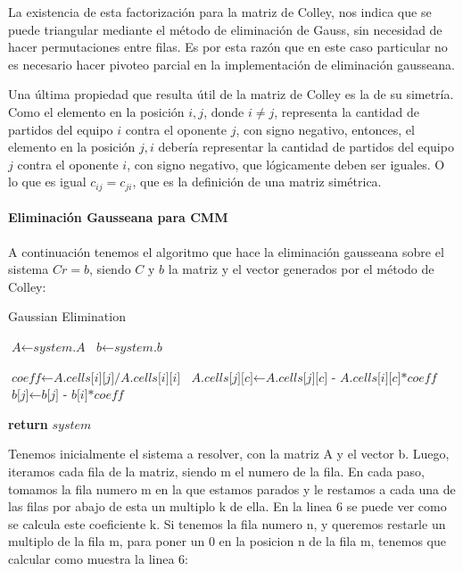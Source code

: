 \documentclass[a4paper]{article}
\begin{document}
La existencia de esta factorización para la matriz de Colley, nos indica que se puede triangular mediante el método de eliminación de Gauss, sin necesidad de hacer permutaciones entre filas. Es por esta razón que en este caso particular no es necesario hacer pivoteo parcial en la implementación de eliminación gausseana.

Una última propiedad que resulta útil de la matriz de Colley es la de su simetría. Como el elemento en la posición $i,j$, donde $i \neq j$, representa la cantidad de partidos del equipo $i$ contra el oponente $j$, con signo negativo, entonces, el elemento en la posición $j,i$ debería representar la cantidad de partidos del equipo $j$ contra el oponente $i$, con signo negativo, que lógicamente deben ser iguales. O lo que es igual $c_{ij} = c_{ji}$, que es la definición de una matriz simétrica.

\paragraph{Eliminación Gausseana para CMM}

A continuación tenemos el algoritmo que hace la eliminación gausseana sobre el sistema $Cr = b$, siendo $C$ y $b$ la matriz y el vector generados por el método de Colley:

\begin{algorithm}
\caption{Gaussian Elimination}\label{euclid}
\begin{algorithmic}[1]


\State $\textit{A} \gets \textit{system.A}$
\State $\textit{b} \gets \textit{system.b}$

        \State $\textit{coeff} \gets \textit{A.cells[i][j]/A.cells[i][i]}$
            \State $\textit{A.cells[j][c]} \gets \textit{A.cells[j][c] - A.cells[i][c]*coeff}$
        \EndFor
		\State $\textit{b[j]} \gets \textit{b[j] - b[i]*coeff}$
    \EndFor
\EndFor

\State \textbf{return} $\textit{system}$
\EndProcedure
\end{algorithmic}
\end{algorithm}

Tenemos inicialmente el sistema a resolver, con la matriz A y el vector b. Luego, iteramos cada fila de la matriz, siendo m el numero de la fila. En cada paso, tomamos la fila numero m en la que estamos parados y le restamos a cada una de las filas por abajo de esta un multiplo k de ella. En la linea 6 se puede ver como se calcula este coeficiente k. Si tenemos la fila numero n, y queremos restarle un multiplo de la fila m, para poner un 0 en la posicion n de la fila m, tenemos que calcular como muestra la linea 6:
\end{document}
